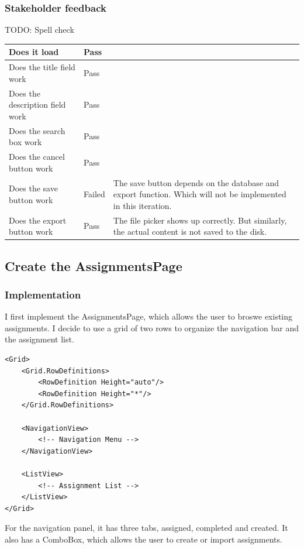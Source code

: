 \documentclass[a4paper]{report}
\begin{document}
\subsubsection{Stakeholder feedback}

TODO: Spell check

\begin{tabulary}{\linewidth}{|L|l|L|}
    \hline
    Does it load & Pass & \\
    \hline
    Does the title field work & Pass & \\
    \hline
    Does the description field work & Pass & \\
    \hline
    Does the search box work & Pass & \\
    \hline
    Does the cancel button work & Pass & \\
    \hline
    Does the save button work & Failed & The save button depends on the database and export function. Which will not be implemented in this iteration. \\
    \hline
    Does the export button work & Pass & The file picker shows up correctly. But similarly, the actual content is not saved to the disk. \\
    \hline
\end{tabulary}

\subsection{Create the AssignmentsPage}

\subsubsection{Implementation}

I first implement the AssignmentsPage, which allows the user to broswe existing assignments. I decide to use a grid of two rows to organize the navigation bar and the assignment list.

\begin{verbatim}
<Grid>
    <Grid.RowDefinitions>
        <RowDefinition Height="auto"/>
        <RowDefinition Height="*"/>
    </Grid.RowDefinitions>

    <NavigationView>
        <!-- Navigation Menu -->
    </NavigationView>

    <ListView>
        <!-- Assignment List -->
    </ListView>
</Grid>
\end{verbatim}

For the navigation panel, it has three tabs, assigned, completed and created. It also has a ComboBox, which allows the user to create or import assignments.
\end{document}
